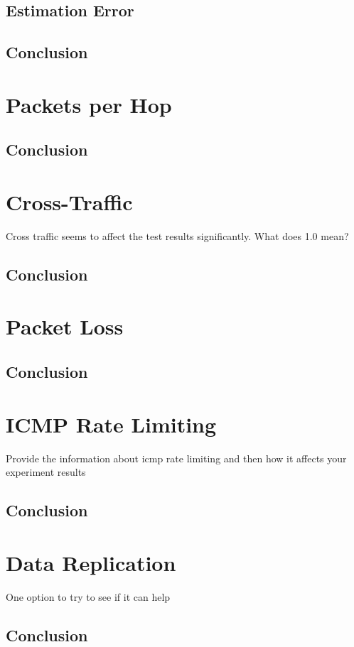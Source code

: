 \subsection*{Estimation Error}

\subsection*{Conclusion}


\section{Packets per Hop}

\subsection*{Conclusion}

\section{Cross-Traffic}
Cross traffic seems to affect the test results significantly. 
What does 1.0 mean?

\subsection*{Conclusion}

\section{Packet Loss}

\subsection*{Conclusion}

\section{ICMP Rate Limiting}
Provide the information about icmp rate limiting and then how it affects your experiment results

\subsection*{Conclusion}


\section{Data Replication}
One option to try to see if it can help

\subsection*{Conclusion}

